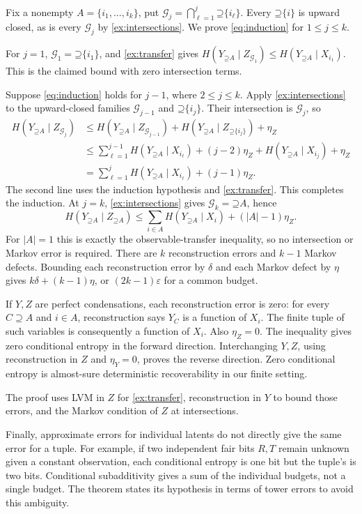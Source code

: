 \documentclass[11pt]{article}
\newcommand{\Up}{\mathord{\supseteq}}
\begin{document}
\begin{solution}[ex:induction]
Fix a nonempty $A=\{i_1,\ldots,i_k\}$, put
$\mathcal{G}_j=\bigcap_{\ell=1}^{j}\Up\{i_\ell\}$.
Every $\Up\{i\}$ is upward closed, as is every $\mathcal{G}_j$ by \cref{ex:intersections}.
We prove \eqref{eq:induction} for $1\le j\le k$.

For $j=1$, $\mathcal{G}_1=\Up\{i_1\}$, and \cref{ex:transfer} gives
$H(Y_{\Up A}\mid Z_{\mathcal{G}_1})\le H(Y_{\Up A}\mid X_{i_1})$. This is the claimed
bound with zero intersection terms.

Suppose \eqref{eq:induction} holds for $j-1$, where $2\le j\le k$.
Apply \cref{ex:intersections} to the upward-closed families $\mathcal{G}_{j-1}$ and
$\Up\{i_j\}$. Their intersection is $\mathcal{G}_j$, so
\begin{align*}
 H(Y_{\Up A}\mid Z_{\mathcal{G}_j})
 &\le H(Y_{\Up A}\mid Z_{\mathcal{G}_{j-1}})
       +H(Y_{\Up A}\mid Z_{\Up\{i_j\}})+\eta_Z\\
 &\le \sum_{\ell=1}^{j-1}H(Y_{\Up A}\mid X_{i_\ell})+(j-2)\eta_Z
       +H(Y_{\Up A}\mid X_{i_j})+\eta_Z\\
 &=\sum_{\ell=1}^{j}H(Y_{\Up A}\mid X_{i_\ell})+(j-1)\eta_Z.
\end{align*}
The second line uses the induction hypothesis and \cref{ex:transfer}. This completes the
induction. At $j=k$, \cref{ex:intersections} gives $\mathcal{G}_k=\Up A$, hence
\[
 H(Y_{\Up A}\mid Z_{\Up A})
 \le\sum_{i\in A}H(Y_{\Up A}\mid X_i)+(|A|-1)\eta_Z.
\]
For $|A|=1$ this is exactly the observable-transfer inequality, so no intersection
or Markov error is required. There are $k$ reconstruction errors and $k-1$
Markov defects.
Bounding each reconstruction error by $\delta$ and each Markov defect by
$\eta$ gives
$k\delta+(k-1)\eta$, or $(2k-1)\varepsilon$ for a common budget.

If $Y,Z$ are perfect condensations, each reconstruction error is zero: for every
$C\supseteq A$ and $i\in A$, reconstruction says $Y_C$ is a function
of $X_i$. The finite tuple of such variables is consequently a function of
$X_i$. Also $\eta_Z=0$. The inequality gives zero conditional entropy in the
forward direction. Interchanging $Y,Z$, using reconstruction in $Z$
and $\eta_Y=0$, proves the reverse direction. Zero conditional entropy is
almost-sure deterministic recoverability in our finite setting.

The proof uses LVM in $Z$ for \cref{ex:transfer}, reconstruction in $Y$ to bound those errors, and the Markov condition of $Z$
at intersections.

Finally, approximate errors for individual latents do not directly give the same error for
a tuple. For example, if two independent fair bits $R,T$ remain unknown given
a constant observation, each conditional entropy is one bit but the tuple's
is two bits. Conditional subadditivity gives a sum of the individual budgets, not a
single budget. The theorem states its hypothesis in terms of tower errors to
avoid this ambiguity.
\end{solution}
\end{document}
